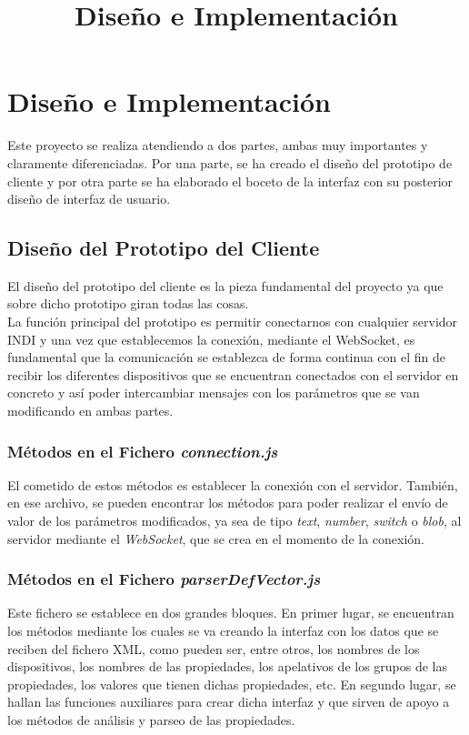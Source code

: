 \chapter{Diseño e Implementación}
\title{Diseño e Implementación}
\label{cap:DisenoEImplementacion}
Este proyecto se realiza atendiendo a dos partes, ambas muy importantes y claramente diferenciadas. Por una parte, se ha creado el diseño del prototipo de cliente y por otra parte se ha elaborado el boceto de la interfaz con su posterior diseño de interfaz de usuario.

\section{Diseño del Prototipo del Cliente}
El diseño del prototipo del cliente es la pieza fundamental del proyecto ya que sobre dicho prototipo giran todas las cosas.\\

La función principal del prototipo es permitir conectarnos con cualquier servidor INDI y una vez que establecemos la conexión, mediante el WebSocket, es fundamental que la comunicación se establezca de forma continua con el fin de recibir los diferentes dispositivos que se encuentran conectados con el servidor en concreto y así poder intercambiar mensajes con los parámetros que se van modificando en ambas partes.

\subsection{Métodos en el Fichero \textit{connection.js}}
El cometido de estos métodos es establecer la conexión con el servidor.
También, en ese archivo, se pueden encontrar los métodos para poder realizar el envío de valor de los parámetros modificados, ya sea de tipo \textit{text}, \textit{number}, \textit{switch} o \textit{blob}, al servidor mediante el \textit{WebSocket}, que se crea en el momento de la conexión.

\subsection{Métodos en el Fichero \textit{parserDefVector.js}}
Este fichero se establece en dos grandes bloques. En primer lugar, se encuentran los métodos mediante los cuales se va creando la interfaz con los datos que se reciben del fichero XML, como pueden ser, entre otros, los nombres de los dispositivos, los nombres de las propiedades, los apelativos de los grupos de las propiedades, los valores que tienen dichas propiedades, etc. En segundo lugar, se hallan las funciones auxiliares para crear dicha interfaz y que sirven de apoyo a los métodos de análisis y parseo de las propiedades.\\

